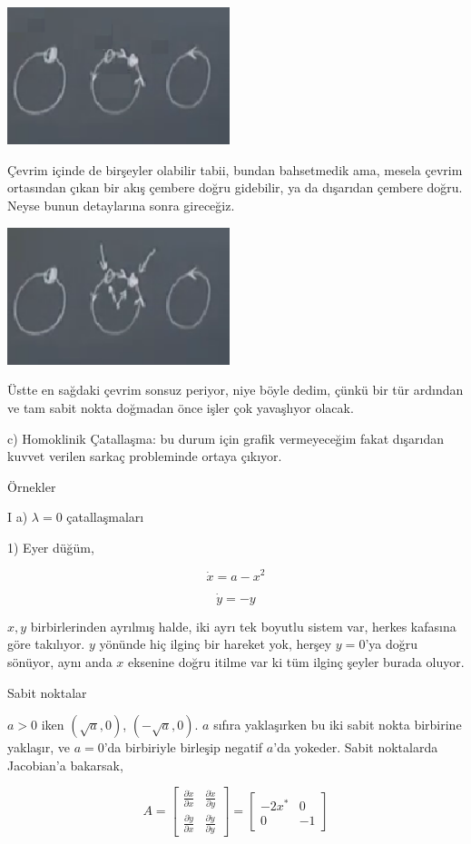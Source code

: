 \documentclass[12pt,fleqn]{article}\usepackage{../../common}
\begin{document}
\includegraphics[height=4cm]{12_09.png}

Çevrim içinde de birşeyler olabilir tabii, bundan bahsetmedik ama, mesela çevrim
ortasından çıkan bir akış çembere doğru gidebilir, ya da dışarıdan çembere
doğru. Neyse bunun detaylarına sonra gireceğiz.

\includegraphics[height=4cm]{12_10.png}

Üstte en sağdaki çevrim sonsuz periyor, niye böyle dedim, çünkü bir tür ardından
ve tam sabit nokta doğmadan önce işler çok yavaşlıyor olacak.

c) Homoklinik Çatallaşma: bu durum için grafik vermeyeceğim fakat dışarıdan
kuvvet verilen sarkaç probleminde ortaya çıkıyor.

Örnekler

I a) $\lambda=0$ çatallaşmaları

1) Eyer düğüm,

$$\dot{x} = a - x^2$$

$$\dot{y} = -y $$

$x,y$ birbirlerinden ayrılmış halde, iki ayrı tek boyutlu sistem var, herkes
kafasına göre takılıyor. $y$ yönünde hiç ilginç bir hareket yok, herşey $y=0$'ya
doğru sönüyor, aynı anda $x$ eksenine doğru itilme var ki tüm ilginç şeyler
burada oluyor. 

Sabit noktalar

$a>0$ iken $(\sqrt{a},0)$, $(-\sqrt{a},0)$. $a$ sıfıra yaklaşırken bu iki sabit
nokta birbirine yaklaşır, ve $a=0$'da birbiriyle birleşip negatif $a$'da
yokeder. Sabit noktalarda Jacobian'a bakarsak,

$$
A =
\left[\begin{array}{rrr}
\frac{\partial \dot{x}}{\partial x} & \frac{\partial \dot{x}}{\partial y}  \\
\frac{\partial \dot{y}}{\partial x} & \frac{\partial \dot{y}}{\partial y} 
\end{array}\right] =
\left[\begin{array}{rrr}
-2x^\ast & 0  \\ 0 & -1
\end{array}\right] 
$$
\end{document}
